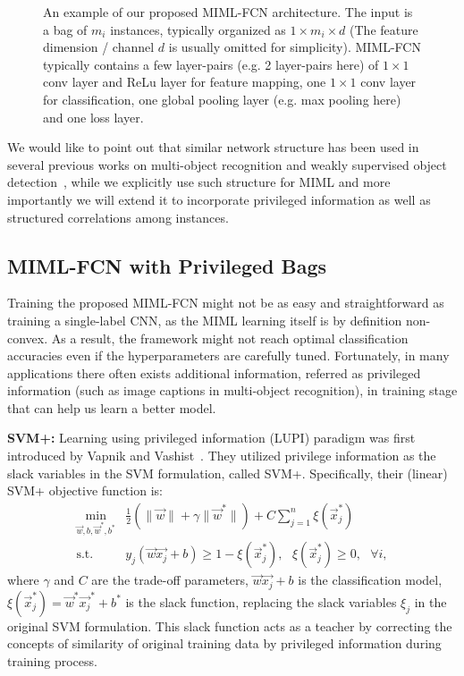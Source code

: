 \documentclass[10pt,twocolumn,letterpaper]{article}
\begin{document}
\begin{figure}
	\caption{An example of our proposed MIML-FCN architecture. The input is a bag of $m_i$ instances, typically organized as $1\times m_i\times d$ (The feature dimension / channel $d$ is usually omitted for simplicity). MIML-FCN typically contains a few layer-pairs (e.g. 2 layer-pairs here) of $1\times 1$ conv layer and ReLu layer for feature mapping, one $1\times 1$ conv layer for classification, one global pooling layer (e.g. max pooling here) and one loss layer.}
	\label{example-fcn}
\end{figure}

We would like to point out that similar network structure has been
used in several previous works on multi-object recognition and
weakly supervised object detection~\cite{Oquab2014,Bilen2016},
while we explicitly use such structure for MIML and more
importantly we will extend it to incorporate privileged
information as well as structured correlations among instances.



\subsection{MIML-FCN with Privileged Bags}
\label{FCN+} Training the proposed MIML-FCN might not be as easy
and straightforward as training a single-label CNN, as the MIML
learning itself is by definition non-convex. As a result, the
framework might not reach optimal classification accuracies even
if the hyperparameters are carefully tuned. Fortunately, in many
applications there often exists additional information, referred
as privileged information (such as image captions in multi-object
recognition), in training stage that can help us learn a better
model.

\textbf{SVM+:} Learning using privileged information (LUPI)
paradigm was first introduced by Vapnik and
Vashist~\cite{Vapnik2009}. They utilized privilege information as
the slack variables in the SVM formulation, called SVM+.
Specifically, their (linear) SVM+ objective function is:
\begin{equation}
\label{svm+}
\begin{matrix}
\underset{\vec{w},b,\vec{w}^*,b^*}{\min} & \frac{1}{2}(\|\vec{w}\|+\gamma\|\vec{w}^*\|) + C\sum_{j=1}^{n}\xi(\vec{x}_j^*) \\
\text{s.t. } & y_j(\vec{w}\vec{x_j}+b) \geq 1 - \xi(\vec{x}_j^*),
\text{ } \xi(\vec{x}_j^*) \geq 0, \text{ } \forall i,
\end{matrix}
\end{equation}
where $\gamma$ and $C$ are the trade-off parameters,
$\vec{w}\vec{x_j}+b$ is the classification model,
$\xi(\vec{x}_j^*) = \vec{w}^{*}\vec{x_j}^*+b^*$ is the slack
function, replacing the slack variables $\xi_j$ in the original
SVM formulation. This slack function acts as a teacher by
correcting the concepts of similarity of original training data by
privileged information during training process.
\end{document}
